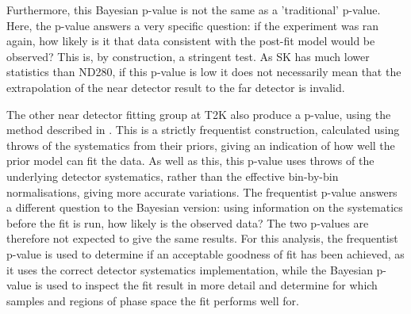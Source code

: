 Furthermore, this Bayesian p-value is not the same as a 'traditional' p-value. Here, the p-value answers a very specific question: if the experiment was ran again, how likely is it that data consistent with the post-fit model would be observed? This is, by construction, a stringent test. As SK has much lower statistics than ND280, if this p-value is low it does not necessarily mean that the extrapolation of the near detector result to the far detector is invalid.

The other near detector fitting group at T2K also produce a p-value, using the method described in \cite{tn324}. This is a strictly frequentist construction, calculated using throws of the systematics from their priors, giving an indication of how well the prior model can fit the data. As well as this, this p-value uses throws of the underlying detector systematics, rather than the effective bin-by-bin normalisations, giving more accurate variations. The frequentist p-value answers a different question to the Bayesian version: using information on the systematics before the fit is run, how likely is the observed data? The two p-values are therefore not expected to give the same results. For this analysis, the frequentist p-value is used to determine if an acceptable goodness of fit has been achieved, as it uses the correct detector systematics implementation, while the Bayesian p-value is used to inspect the fit result in more detail and determine for which samples and regions of phase space the fit performs well for.

\newpage
